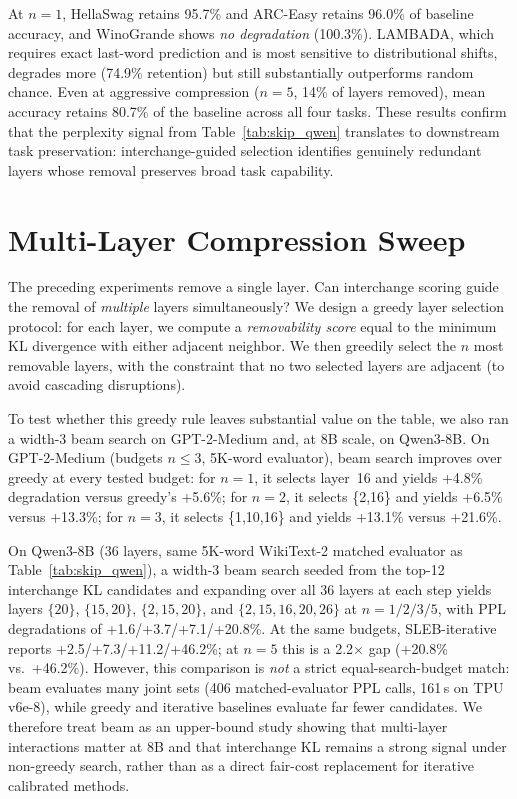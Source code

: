 \documentclass{article}
\begin{document}
At $n{=}1$, HellaSwag retains 95.7\% and ARC-Easy retains 96.0\% of baseline accuracy, and WinoGrande shows \emph{no degradation} (100.3\%). LAMBADA, which requires exact last-word prediction and is most sensitive to distributional shifts, degrades more (74.9\% retention) but still substantially outperforms random chance. Even at aggressive compression ($n{=}5$, 14\% of layers removed), mean accuracy retains 80.7\% of the baseline across all four tasks. These results confirm that the perplexity signal from Table~\ref{tab:skip_qwen} translates to downstream task preservation: interchange-guided selection identifies genuinely redundant layers whose removal preserves broad task capability.

\section{Multi-Layer Compression Sweep}
\label{sec:exp_compression}
\label{sec:app_compression_sweep}

The preceding experiments remove a single layer. Can interchange scoring guide the removal of \emph{multiple} layers simultaneously? We design a greedy layer selection protocol: for each layer, we compute a \emph{removability score} equal to the minimum KL divergence with either adjacent neighbor. We then greedily select the $n$ most removable layers, with the constraint that no two selected layers are adjacent (to avoid cascading disruptions).

To test whether this greedy rule leaves substantial value on the table, we also ran a width-3 beam search on GPT-2-Medium and, at 8B scale, on Qwen3-8B. On GPT-2-Medium (budgets $n\leq 3$, 5K-word evaluator), beam search improves over greedy at every tested budget: for $n{=}1$, it selects layer~16 and yields +4.8\% degradation versus greedy's +5.6\%; for $n{=}2$, it selects \{2,16\} and yields +6.5\% versus +13.3\%; for $n{=}3$, it selects \{1,10,16\} and yields +13.1\% versus +21.6\%.

On Qwen3-8B (36 layers, same 5K-word WikiText-2 matched evaluator as Table~\ref{tab:skip_qwen}), a width-3 beam search seeded from the top-12 interchange KL candidates and expanding over all 36 layers at each step yields layers $\{20\}$, $\{15,20\}$, $\{2,15,20\}$, and $\{2,15,16,20,26\}$ at $n{=}1/2/3/5$, with PPL degradations of +1.6/+3.7/+7.1/+20.8\%. At the same budgets, SLEB-iterative reports +2.5/+7.3/+11.2/+46.2\%; at $n{=}5$ this is a 2.2$\times$ gap (+20.8\% vs.\ +46.2\%). However, this comparison is \emph{not} a strict equal-search-budget match: beam evaluates many joint sets (406 matched-evaluator PPL calls, 161\,s on TPU v6e-8), while greedy and iterative baselines evaluate far fewer candidates. We therefore treat beam as an upper-bound study showing that multi-layer interactions matter at 8B and that interchange KL remains a strong signal under non-greedy search, rather than as a direct fair-cost replacement for iterative calibrated methods.
\end{document}

